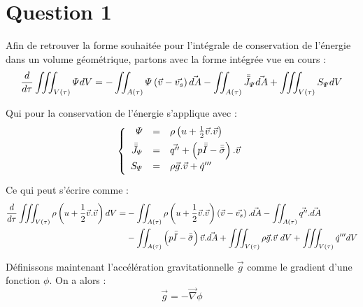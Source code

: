 \section{Question 1\label{section:ex1}}

Afin de retrouver la forme souhaitée pour l'intégrale de conservation de l'énergie dans un volume géométrique, partons avec la forme intégrée vue en cours :
\begin{equation}
    \frac{d}{d\tau}\iiint_{V(\tau)} \varPsi dV = -\iint_{A(\tau)} \varPsi \left(\Vec{v}-\Vec{v_s} \right)\vec{dA} - \iint_{A(\tau)} \bar{\bar{J}}_{\varPsi} \vec{dA} + \iiint_{V(\tau)} S_{\varPsi} dV
\end{equation}

Qui pour la conservation de l'énergie s'applique avec :
\begin{equation}
    \left\{
    \begin{array}{r c l}
    \varPsi &=& \rho \left(u+\frac{1}{2} \vec{v}.\vec{v} \right) \\[1ex]
    \bar{\bar{J}}_{\varPsi} &=& \vec{q''} + \left(p\bar{\bar{I}} - \bar{\bar{\sigma}}  \right).\vec{v}  \\[1ex]
    S_{\varPsi} &=& \rho \vec{g}.\vec{v} + \dot{q}''' \\[1ex]
    \end{array}
    \right.
\end{equation}
Ce qui peut s'écrire comme :
\begin{equation}
\begin{split}
    \frac{d}{d\tau}\iiint_{V(\tau)} \rho \left(u+\frac{1}{2} \vec{v}.\vec{v} \right) dV = &-\iint_{A(\tau)} \rho \left(u+\frac{1}{2} \vec{v}.\vec{v} \right) \left(\Vec{v}-\Vec{v_s} \right).\vec{dA} - \iint_{A(\tau)} \vec{q''}.\vec{dA}\\ &- \iint_{A(\tau)} \left(p\bar{\bar{I}} - \bar{\bar{\sigma}}  \right)\vec{v} .\vec{dA} + \iiint_{V(\tau)} \rho \vec{g}.\vec{v} ~ dV + \iiint_{V(\tau)}\dot{q}''' dV
\end{split}
\end{equation}

Définissons maintenant l'accélération gravitationnelle $\vec{g}$ comme le gradient d'une fonction $\phi$. On a alors :
\begin{equation}
    \vec{g} = - \vec{\nabla}\phi
\end{equation}

